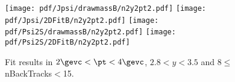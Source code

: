 \begin{figure}[H]
\begin{center}
\texttt{[image: pdf/Jpsi/drawmassB/n2y2pt2.pdf]}
\texttt{[image: pdf/Jpsi/2DFitB/n2y2pt2.pdf]}
\vspace*{-0.5cm}
\texttt{[image: pdf/Psi2S/drawmassB/n2y2pt2.pdf]}
\texttt{[image: pdf/Psi2S/2DFitB/n2y2pt2.pdf]}
\vspace*{-0.5cm}
\end{center}
\caption{Fit results in $2\gevc<\pt<4\gevc$, $2.8<y<3.5$ and 8$\leq$nBackTracks$<$15.}
\label{Fitn2y2pt2}
\end{figure}
